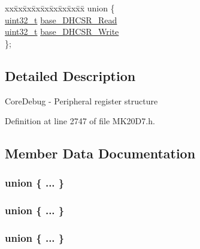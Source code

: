 \begin{DoxyCompactItemize}
\begin{tabbing}
\end{tabbing}\item 
\begin{tabbing}
xx\=xx\=xx\=xx\=xx\=xx\=xx\=xx\=xx\=\kill
union \{\\
\>\hyperlink{_p_e___types_8h_a33594304e786b158f3fb30289278f5af}{uint32\_t} \hyperlink{struct_core_debug___mem_map_a4968901505f61e2a98c9196a8ac7584b}{base\_DHCSR\_Read}\\
\>\hyperlink{_p_e___types_8h_a33594304e786b158f3fb30289278f5af}{uint32\_t} \hyperlink{struct_core_debug___mem_map_a57de52c8c1eb5789546543f2408ce487}{base\_DHCSR\_Write}\\
\}; \\

\end{tabbing}\end{DoxyCompactItemize}


\subsection{Detailed Description}
Core\+Debug -\/ Peripheral register structure 

Definition at line 2747 of file M\+K20\+D7.\+h.



\subsection{Member Data Documentation}
\subsubsection[{\texorpdfstring{"@106}{@106}}]{\setlength{\rightskip}{0pt plus 5cm}union \{ ... \} }\hypertarget{struct_core_debug___mem_map_a8919e7c305d1575fc0b5e752b5201035}{}\label{struct_core_debug___mem_map_a8919e7c305d1575fc0b5e752b5201035}
\subsubsection[{\texorpdfstring{"@16}{@16}}]{\setlength{\rightskip}{0pt plus 5cm}union \{ ... \} }\hypertarget{struct_core_debug___mem_map_aedbae45a1e2cb049260e74c178646b9f}{}\label{struct_core_debug___mem_map_aedbae45a1e2cb049260e74c178646b9f}
\subsubsection[{\texorpdfstring{"@67}{@67}}]{\setlength{\rightskip}{0pt plus 5cm}union \{ ... \} }\hypertarget{struct_core_debug___mem_map_af14b7748e252b6ab7e684210465ddf3a}{}\label{struct_core_debug___mem_map_af14b7748e252b6ab7e684210465ddf3a}
